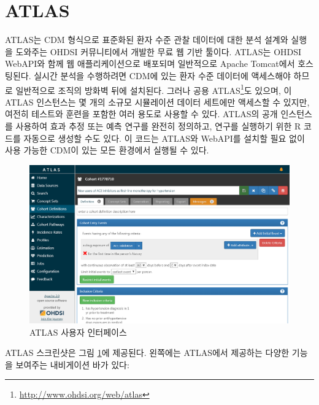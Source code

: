 \documentclass[11pt]{book}
\let\rmarkdownfootnote\footnote%
\def\footnote{\protect\rmarkdownfootnote}
\theoremstyle{definition}
\theoremstyle{definition}
\theoremstyle{definition}
\theoremstyle{remark}
\begin{document}
\section{ATLAS}\label{atlas}

ATLAS는 CDM 형식으로 표준화된 환자 수준 관찰 데이터에 대한 분석 설계와
실행을 도와주는 OHDSI 커뮤니티에서 개발한 무료 웹 기반 툴이다. ATLAS는
OHDSI WebAPI와 함께 웹 애플리케이션으로 배포되며 일반적으로 Apache
Tomcat에서 호스팅된다. 실시간 분석을 수행하려면 CDM에 있는 환자 수준
데이터에 액세스해야 하므로 일반적으로 조직의 방화벽 뒤에 설치된다.
그러나 공용 ATLAS\footnote{\url{http://www.ohdsi.org/web/atlas}}도
있으며, 이 ATLAS 인스턴스는 몇 개의 소규모 시뮬레이션 데이터 세트에만
액세스할 수 있지만, 여전히 테스트와 훈련을 포함한 여러 용도로 사용할 수
있다. ATLAS의 공개 인스턴스를 사용하여 효과 추정 또는 예측 연구를 완전히
정의하고, 연구를 실행하기 위한 R 코드를 자동으로 생성할 수도 있다. 이
코드는 ATLAS와 WebAPI를 설치할 필요 없이 사용 가능한 CDM이 있는 모든
환경에서 실행될 수 있다. 

\begin{figure}

{\centering \includegraphics[width=1\linewidth]{images/OhdsiAnalyticsTools/atlas} 

}

\caption{ATLAS 사용자 인터페이스}\label{fig:atlas}
\end{figure}

ATLAS 스크린샷은 그림 \ref{fig:atlas}에 제공된다. 왼쪽에는 ATLAS에서
제공하는 다양한 기능을 보여주는 내비게이션 바가 있다:
\end{document}
